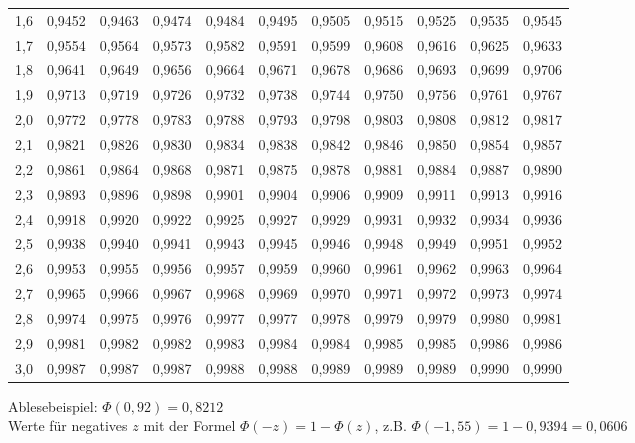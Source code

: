 \begin{table}[h]
\begin{tabular}{|c|ccccc|ccccc|}
1,6 & 0,9452 & 0,9463 & 0,9474 & 0,9484 & 0,9495 & 0,9505 & 0,9515 & 0,9525 & 0,9535 & 0,9545 \\
1,7 & 0,9554 & 0,9564 & 0,9573 & 0,9582 & 0,9591 & 0,9599 & 0,9608 & 0,9616 & 0,9625 & 0,9633 \\
1,8 & 0,9641 & 0,9649 & 0,9656 & 0,9664 & 0,9671 & 0,9678 & 0,9686 & 0,9693 & 0,9699 & 0,9706 \\
1,9 & 0,9713 & 0,9719 & 0,9726 & 0,9732 & 0,9738 & 0,9744 & 0,9750 & 0,9756 & 0,9761 & 0,9767 \\
2,0 & 0,9772 & 0,9778 & 0,9783 & 0,9788 & 0,9793 & 0,9798 & 0,9803 & 0,9808 & 0,9812 & 0,9817 \\ \hline
2,1 & 0,9821 & 0,9826 & 0,9830 & 0,9834 & 0,9838 & 0,9842 & 0,9846 & 0,9850 & 0,9854 & 0,9857 \\
2,2 & 0,9861 & 0,9864 & 0,9868 & 0,9871 & 0,9875 & 0,9878 & 0,9881 & 0,9884 & 0,9887 & 0,9890 \\
2,3 & 0,9893 & 0,9896 & 0,9898 & 0,9901 & 0,9904 & 0,9906 & 0,9909 & 0,9911 & 0,9913 & 0,9916 \\
2,4 & 0,9918 & 0,9920 & 0,9922 & 0,9925 & 0,9927 & 0,9929 & 0,9931 & 0,9932 & 0,9934 & 0,9936 \\
2,5 & 0,9938 & 0,9940 & 0,9941 & 0,9943 & 0,9945 & 0,9946 & 0,9948 & 0,9949 & 0,9951 & 0,9952 \\ \hline
2,6 & 0,9953 & 0,9955 & 0,9956 & 0,9957 & 0,9959 & 0,9960 & 0,9961 & 0,9962 & 0,9963 & 0,9964 \\
2,7 & 0,9965 & 0,9966 & 0,9967 & 0,9968 & 0,9969 & 0,9970 & 0,9971 & 0,9972 & 0,9973 & 0,9974 \\
2,8 & 0,9974 & 0,9975 & 0,9976 & 0,9977 & 0,9977 & 0,9978 & 0,9979 & 0,9979 & 0,9980 & 0,9981 \\
2,9 & 0,9981 & 0,9982 & 0,9982 & 0,9983 & 0,9984 & 0,9984 & 0,9985 & 0,9985 & 0,9986 & 0,9986 \\
3,0 & 0,9987 & 0,9987 & 0,9987 & 0,9988 & 0,9988 & 0,9989 & 0,9989 & 0,9989 & 0,9990 & 0,9990 \\ \hline
\end{tabular}
\end{table}

\noindent
Ablesebeispiel: $\Phi(0,92) = 0,8212$\\

\noindent
Werte für negatives $z$ mit der Formel $\Phi(-z) = 1-\Phi(z)$, z.B. $\Phi(-1,55) = 1-0,9394 = 0,0606$

